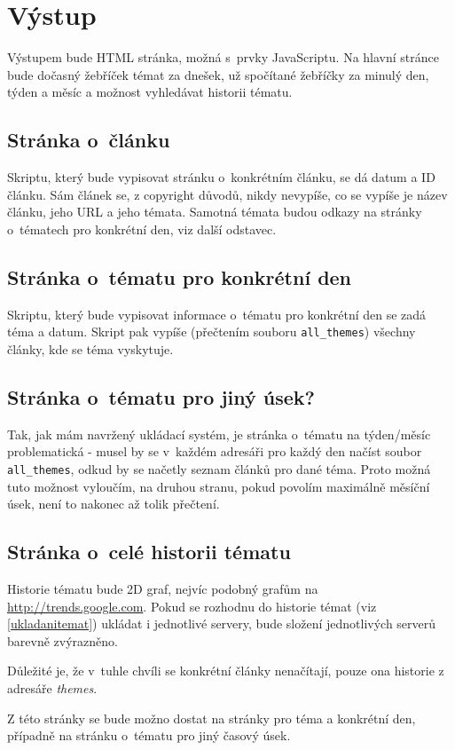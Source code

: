 \documentclass[12pt]{amsart}
\begin{document}
\section{Výstup}
Výstupem bude HTML stránka, možná s~prvky JavaScriptu. Na hlavní stránce bude dočasný žebříček témat za dnešek, už spočítané žebříčky za minulý den, týden a měsíc a možnost vyhledávat historii tématu.

\subsection{Stránka o~článku}
Skriptu, který bude vypisovat stránku o~konkrétním článku, se dá datum a ID článku. Sám článek se, z copyright důvodů, nikdy nevypíše, co se vypíše je název článku, jeho URL a jeho témata. Samotná témata budou odkazy na stránky o~tématech pro konkrétní den, viz další odstavec.

\subsection{Stránka o~tématu pro konkrétní den}
Skriptu, který bude vypisovat informace o~tématu pro konkrétní den se zadá téma a datum. Skript pak vypíše (přečtením souboru \texttt{all\_themes}) všechny články, kde se téma vyskytuje.

\subsection{Stránka o~tématu pro jiný úsek?}
Tak, jak mám navržený ukládací systém, je stránka o~tématu na týden/měsíc problematická - musel by se v~každém adresáři pro každý den načíst soubor \texttt{all\_themes}, odkud by se načetly seznam článků pro dané téma. Proto možná tuto možnost vyloučím, na druhou stranu, pokud povolím maximálně měsíční úsek, není to nakonec až tolik přečtení.

\subsection{Stránka o~celé historii tématu}
Historie tématu bude 2D graf, nejvíc podobný grafům na \url{http://trends.google.com}. Pokud se rozhodnu do historie témat (viz \ref{ukladanitemat}) ukládat i jednotlivé servery, bude složení jednotlivých serverů barevně zvýrazněno.

Důležité je, že v~tuhle chvíli se konkrétní články nenačítají, pouze ona historie z adresáře \emph{themes}.

Z této stránky se bude možno dostat na stránky pro téma a konkrétní den, případně na stránku o~tématu pro jiný časový úsek.
\end{document}
